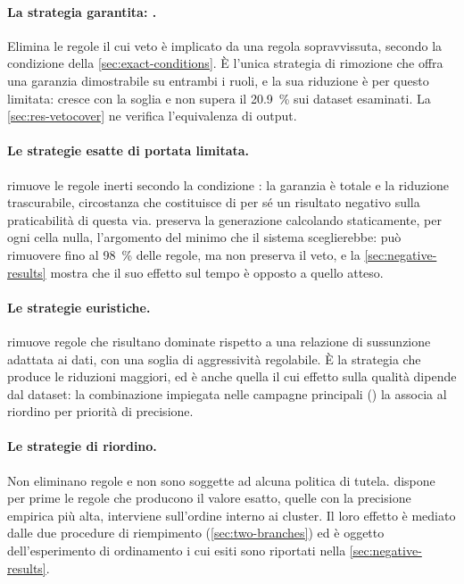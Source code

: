 \paragraph{La strategia garantita: .} Elimina le regole il cui veto è implicato da
una regola sopravvissuta, secondo la condizione \Vtwo{} della \autoref{sec:exact-conditions}. È
l'unica strategia di rimozione che offra una garanzia dimostrabile su entrambi i ruoli, e la sua
riduzione è per questo limitata: cresce con la soglia e non supera il \SI{20.9}{\percent} sui
dataset esaminati. La \autoref{sec:res-vetocover} ne verifica l'equivalenza di output.

\paragraph{Le strategie esatte di portata limitata.}  rimuove le regole inerti secondo
la condizione \Vthree{}: la garanzia è totale e la riduzione trascurabile, circostanza che
costituisce di per sé un risultato negativo sulla praticabilità di questa via.
 preserva la generazione calcolando staticamente, per ogni cella nulla,
l'argomento del minimo che il sistema sceglierebbe: può rimuovere fino al \SI{98}{\percent} delle
regole, ma non preserva il veto, e la \autoref{sec:negative-results} mostra che il suo effetto sul
tempo è opposto a quello atteso.

\paragraph{Le strategie euristiche.}  rimuove regole che risultano dominate
rispetto a una relazione di sussunzione adattata ai dati, con una soglia di aggressività
regolabile. È la strategia che produce le riduzioni maggiori, ed è anche quella il cui effetto
sulla qualità dipende dal dataset: la combinazione impiegata nelle campagne principali
() la associa al riordino per priorità di precisione.

\paragraph{Le strategie di riordino.} Non eliminano regole e non sono soggette ad alcuna politica
di tutela.  dispone per prime le regole che producono il valore esatto,
 quelle con la precisione empirica più alta, 
interviene sull'ordine interno ai cluster. Il loro effetto è mediato dalle due procedure di
riempimento (\autoref{sec:two-branches}) ed è oggetto dell'esperimento di ordinamento
i cui esiti sono riportati nella \autoref{sec:negative-results}.

